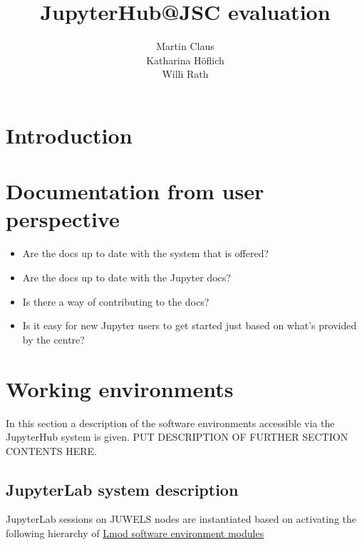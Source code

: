 \documentclass[11pt,a4paper]{article}
\title{\textbf{JupyterHub@JSC evaluation}}
\author{
  Martin Claus \\ %
	Katharina Höflich \\
	Willi Rath}
\begin{document}
\maketitle
\tableofcontents


%

\section{Introduction}
\label{s-introductoin}


\section{Documentation from user perspective}
\label{s-doc-from-user-pov}

\begin{itemize}
	\item Are the docs up to date with the system that is offered?
	\item Are the docs up to date with the Jupyter docs?
	\item Is there a way of contributing to the docs?
	\item Is it easy for new Jupyter users to get started just based on what's provided by the centre?
\end{itemize}

\citet{Lorem2020a} %
\section{Working environments}
\label{sect:working-envs}

In this section a description of the software environments accessible via the JupyterHub system is given.
PUT DESCRIPTION OF FURTHER SECTION CONTENTS HERE.

\subsection{JupyterLab system description}
\label{sect:system-description}

JupyterLab sessions on JUWELS nodes are instantiated based on activating the following hierarchy of \href{https://lmod.readthedocs.io/en/latest/index.html}{Lmod software environment modules}
\end{document}
